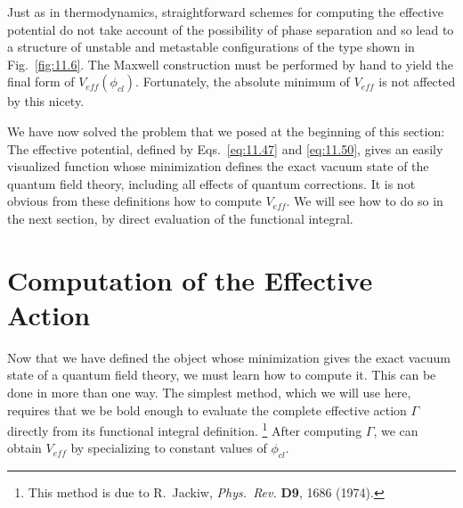 Just as in thermodynamics, straightforward schemes for computing the
effective potential do not take account of the possibility of phase separation
and so lead to a structure of unstable and metastable configurations of the
type shown in Fig.~\ref{fig:11.6}.  The Maxwell construction must be performed
by hand to yield the final form of $V_{eff}(\phi_{cl})$.  Fortunately, the
absolute minimum of $V_{eff}$ is not affected by this nicety.

We have now solved the problem that we posed at the beginning of this
section: The effective potential, defined by Eqs.~\eqref{eq:11.47} and
\eqref{eq:11.50}, gives an easily visualized function whose minimization
defines the exact vacuum state of the quantum field theory, including all
effects of quantum corrections.  It is not obvious from these definitions how
to compute $V_{eff}$.  We will see how to do so in the next section, by direct
evaluation of the functional integral.

\section{Computation of the Effective Action}

Now that we have defined the object whose minimization gives the exact vacuum
state of a quantum field theory, we must learn how to compute it.  This can be
done in more than one way.  The simplest method, which we will use here,
requires that we be bold enough to evaluate the complete effective action
$\Gamma$ directly from its functional integral definition.%
\footnote{This method is due to R.~Jackiw, \emph{Phys.\ Rev.} \textbf{D9},
1686 (1974).}  After computing $\Gamma$, we can obtain $V_{eff}$ by
specializing to constant values of $\phi_{cl}$.

